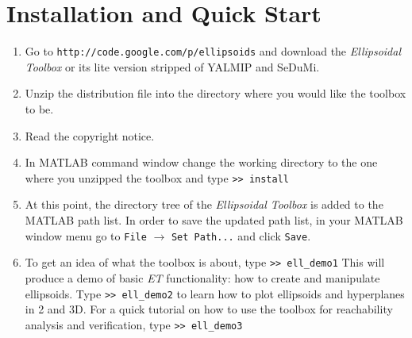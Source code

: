 \section{Installation and Quick Start}
\begin{enumerate}
\item Go to
\newline
{\tt http://code.google.com/p/ellipsoids}
\newline
and download the {\it Ellipsoidal Toolbox} or its lite version stripped
of YALMIP and SeDuMi.
\item Unzip the distribution file into the directory where you would like
the toolbox to be.
\item Read the copyright notice.
\item In MATLAB command window change the working directory to the one where
you unzipped the toolbox and type
\newline
{\tt >> install}
\item At this point, the directory tree of the {\it Ellipsoidal Toolbox} is
added to the MATLAB path list. In order to save the updated path list,
in your MATLAB window menu go to {\tt File} $\rightarrow$ {\tt Set Path...} and
click {\tt Save}.
\item To get an idea of what the toolbox is about, type
\newline
{\tt >> ell\_demo1}
\newline
This will produce a demo of basic {\it ET} functionality: how to create
and manipulate ellipsoids.
\newline
Type
\newline
{\tt >> ell\_demo2}
\newline
to learn how to plot ellipsoids and hyperplanes in 2 and 3D.
\newline
For a quick tutorial on how to use the toolbox for reachability analysis
and verification, type
\newline
{\tt >> ell\_demo3}
\end{enumerate}




